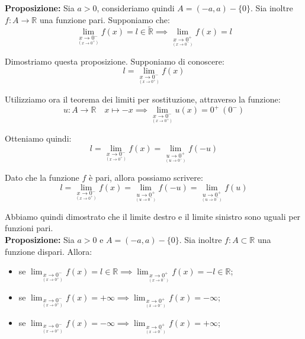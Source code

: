 \documentclass{article}
\begin{document}
\noindent\textbf{Proposizione:} Sia $a > 0$, consideriamo quindi $A = (-a, a) - \{0\}$. Sia inoltre $f: A \xrightarrow{} \mathbb{R}$ una funzione pari. Supponiamo che:
\begin{equation*}
    \lim_{ \underset{\scriptstyle (x \to 0^+)}{x \to 0^-}} f(x) = l \in \widetilde{\mathbb{R}} \implies \lim_{ \underset{\scriptstyle (x \to 0^-)}{x \to 0^+}} f(x) = l
\end{equation*}

\noindent Dimostriamo questa proposizione. Supponiamo di conoscere:
\begin{equation*}
    l = \lim_{\underset{\scriptstyle (x \to 0^+)}{x \to 0^-}} f(x)
\end{equation*}

\noindent Utilizziamo ora il teorema dei limiti per sostituzione, attraverso la funzione:
\begin{equation*}
    u: A \xrightarrow{} \mathbb{R} \quad x \longmapsto -x \implies \lim_{\underset{\scriptstyle (x \to 0^+)}{x \to 0^-}} u(x) = 0^+ \ (0^-)
\end{equation*}

\noindent Otteniamo quindi: 
\begin{equation*}
    l = \lim_{\underset{\scriptstyle (x \to 0^+)}{x \to 0^-}} f(x) = \lim_{\underset{\scriptstyle (u \to 0^-)}{u \to 0^+}} f(-u)
\end{equation*}

\noindent Dato che la funzione $f$ è pari, allora possiamo scrivere:
\begin{equation*}
    l = \lim_{\underset{\scriptstyle (x \to 0^+)}{x \to 0^-}} f(x) = \lim_{\underset{\scriptstyle (u \to 0^-)}{u \to 0^+}} f(-u) = \lim_{\underset{\scriptstyle (u \to 0^-)}{u \to 0^+}} f(u)
\end{equation*}

\noindent Abbiamo quindi dimostrato che il limite destro e il limite sinistro sono uguali per funzioni pari.\\

\noindent\textbf{Proposizione:} Sia $a > 0$ e $A = (-a, a) - \{0\}$. Sia inoltre $f: A \subset \mathbb{R}$ una funzione dispari. Allora:
\begin{itemize}
    \item se $\lim_{\underset{\scriptstyle (x \to 0^+)}{x \to 0^-}} f(x) = l \in \mathbb{R} \implies \lim_{\underset{\scriptstyle (x \to 0^-)}{x \to 0^+}} f(x) = -l \in \mathbb{R}$;
    \item se $\lim_{\underset{\scriptstyle (x \to 0^+)}{x \to 0^-}} f(x) = +\infty \implies \lim_{\underset{\scriptstyle (x \to 0^-)}{x \to 0^+}} f(x) = -\infty$;
    \item se $\lim_{\underset{\scriptstyle (x \to 0^+)}{x \to 0^-}} f(x) = -\infty \implies \lim_{\underset{\scriptstyle (x \to 0^-)}{x \to 0^+}} f(x) = +\infty$;
\end{itemize}
\end{document}
